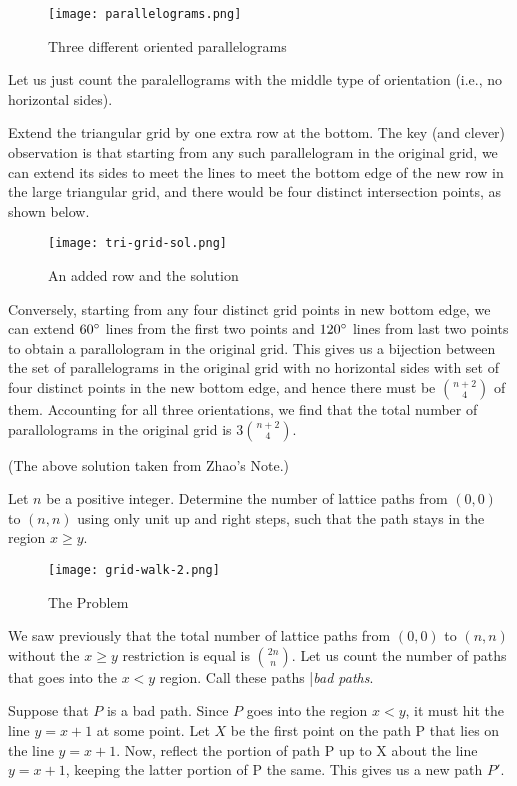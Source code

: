 \begin{figure}[ht]
\centering
	\texttt{[image: parallelograms.png]}
	\caption{Three different oriented parallelograms}
\end{figure}
Let us
just count the paralellograms with the middle type of orientation (i.e., no horizontal
sides).

Extend the triangular grid by one extra row at the bottom. The key (and clever)
observation is that starting from any such parallelogram in the original grid, we can
extend its sides to meet the lines to meet the bottom edge of the new row in the large
triangular grid, and there would be four distinct intersection points, as shown below.
\begin{figure}[ht]
\centering
	\texttt{[image: tri-grid-sol.png]}
	\caption{An added row and the solution}
\end{figure}

Conversely, starting from any four distinct grid points in new bottom edge, we
can extend $60^\circ$ lines from the first two points and $120^\circ$ lines from last two points
to obtain a parallologram in the original grid. This gives us a bijection between the set
of parallelograms in the original grid with no horizontal sides with set of four distinct
points in the new bottom edge, and hence there must be $\binom{n+2}{4}$ of them. Accounting for
all three orientations, we find that the total number of parallolograms in the original
grid is $3\binom{n+2}{4}$.

(The above solution taken from Zhao's Note.)

\begin{example}
Let $n$ be a positive integer. Determine the number of lattice paths from
$(0, 0)$ to $(n, n)$ using only unit up and right steps, such that the path stays in the region $x \ge y$.
\end{example}
\begin{figure}[ht]
\centering
	\texttt{[image: grid-walk-2.png]}
	\caption{The Problem}
\end{figure}


We saw previously that the total number of lattice paths from $(0, 0)$ to $(n, n)$ without the $x\ge y$ restriction is equal is $\binom{2n}{n}$. Let us count the number of paths that goes into the $x < y$ region. 
Call these paths |\textit{bad paths}.

Suppose that $P$ is a bad path. Since $P$ goes into the region $x < y$, it must hit the
line $y = x + 1$ at some point. Let $X$ be the first point on the path P that lies on the line
$y = x + 1$. Now, reflect the portion of path P up to X about the line $y = x + 1$, keeping
the latter portion of P the same. This gives us a new path $P'$.


